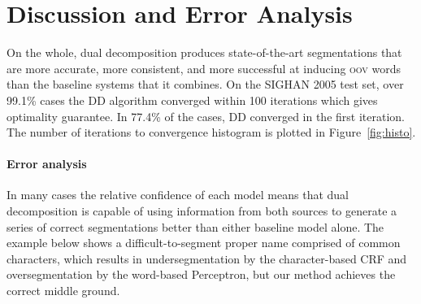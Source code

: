 \section{Discussion and Error Analysis}

On the whole, dual decomposition produces state-of-the-art segmentations that are more accurate, more consistent, and more successful at inducing \textsc{oov} words than the baseline systems that it combines.
On the SIGHAN 2005 test set, over 99.1\% cases the DD algorithm converged within 100 iterations which gives optimality guarantee. 
In 77.4\% of the cases, DD converged in the first iteration. The number of iterations to convergence histogram is plotted in Figure~\ref{fig:histo}.

\paragraph{Error analysis}


%
%
%
In many cases the relative confidence of each model means that dual decomposition is capable of using information from both sources to generate a series of correct segmentations better than either baseline model alone. The example below shows a difficult-to-segment proper name comprised of common characters, which results in undersegmentation by the character-based CRF and oversegmentation by the word-based Perceptron, but our method achieves the correct middle ground.

